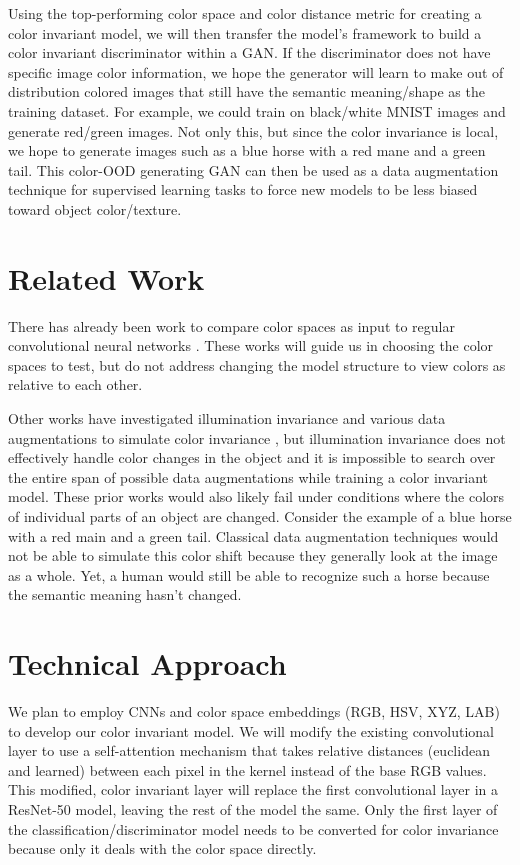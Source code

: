 \documentclass[10pt, a4paper]{article}
\begin{document}
Using the top-performing color space and color distance metric for creating a color invariant model, we will then transfer the model’s framework to build a color invariant discriminator within a GAN. If the discriminator does not have specific image color information, we hope the generator will learn to make out of distribution colored images that still have the semantic meaning/shape as the training dataset. For example, we could train on black/white MNIST images and generate red/green images. Not only this, but since the color invariance is local, we hope to generate images such as a blue horse with a red mane and a green tail. This color-OOD generating GAN can then be used as a data augmentation technique for supervised learning tasks to force new models to be less biased toward object color/texture.

\section{Related Work}

There has already been work to compare color spaces as input to regular convolutional neural networks \cite{Sachin18}. These works will guide us in choosing the color spaces to test, but do not address changing the model structure to view colors as relative to each other.

Other works have investigated illumination invariance \cite{Ng08}\cite{Choi10} \cite{Gevers99} and various data augmentations to simulate color invariance  \cite{Xu22}\cite{Zhang16}, but illumination invariance does not effectively handle color changes in the object and it is impossible to search over the entire span of possible data augmentations while training a color invariant model. These prior works would also likely fail under conditions where the colors of individual parts of an object are changed. Consider the example of a blue horse with a red main and a green tail. Classical data augmentation techniques would not be able to simulate this color shift because they generally look at the image as a whole. Yet, a human would still be able to recognize such a horse because the semantic meaning hasn't changed.

\section{Technical Approach}
\noindent We plan to employ CNNs and color space embeddings (RGB, HSV, XYZ, LAB) to develop our color invariant model. We will modify the existing convolutional layer to use a self-attention mechanism that takes relative distances (euclidean and learned) between each pixel in the kernel instead of the base RGB values. This modified, color invariant layer will replace the first convolutional layer in a ResNet-50 model, leaving the rest of the model the same. Only the first layer of the classification/discriminator model needs to be converted for color invariance because only it deals with the color space directly.
\end{document}
